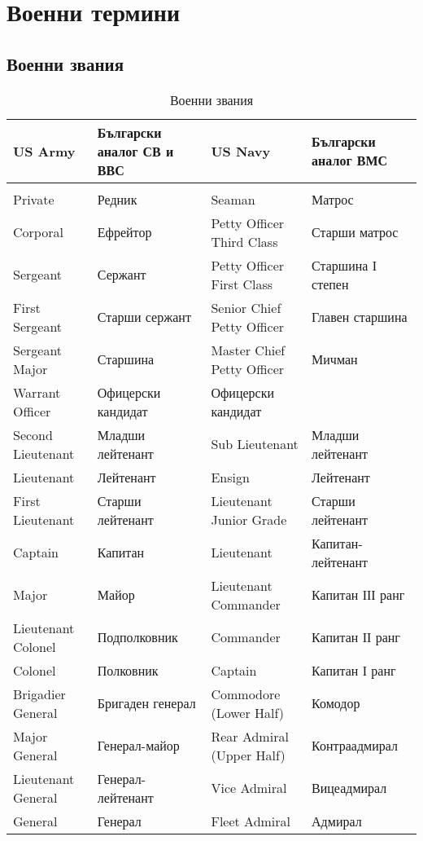 \chapter{Военни термини}

\section{Военни звания}
\begin{longtable}{|p{}|p{}|p{}|p{}|}
\hline
\textbf{US Army} & \textbf{Български аналог СВ и ВВС} & \textbf{US Navy} & \textbf{Български аналог ВМС} \\
\hline
\endhead
\hline
\endfoot
\hline
\caption{Военни звания} \label{tab:voenni-zvanija} \\
\endlastfoot
\hline
 Private & Редник & Seaman & Матрос
\\ Corporal & Ефрейтор & Petty Officer Third Class & Старши матрос
\\ Sergeant & Сержант & Petty Officer First Class & Старшина І степен
\\ First Sergeant & Старши сержант & Senior Chief Petty Officer  &Главен старшина
\\ Sergeant Major & Старшина & Master Chief Petty Officer & Мичман
\\ Warrant Officer & Офицерски кандидат & Офицерски кандидат  
\\ Second Lieutenant & Младши лейтенант & Sub Lieutenant & Младши лейтенант
\\ Lieutenant & Лейтенант & Ensign & Лейтенант
\\ First Lieutenant & Старши лейтенант & Lieutenant Junior Grade & Старши лейтенант
\\ Captain & Капитан & Lieutenant & Капитан-лейтенант
\\ Major & Майор & Lieutenant Commander & Капитан ІІІ ранг
\\ Lieutenant Colonel & Подполковник & Commander & Капитан ІІ ранг
\\ Colonel & Полковник & Captain & Капитан І ранг
\\ Brigadier General & Бригаден генерал & Commodore (Lower Half) & Комодор
\\ Major General & Генерал-майор & Rear Admiral (Upper Half) & Контраадмирал
\\ Lieutenant General & Генерал-лейтенант & Vice Admiral  &Вицеадмирал
\\ General & Генерал & Fleet Admiral & Адмирал
\\
\end{longtable}

